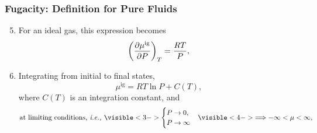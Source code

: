 \documentclass[10pt,compress,handout,ignorenonframetext,unknownkeysallowed]{beamer}
\begin{document}
\begin{frame}
  \frametitle{Fugacity: Definition for Pure Fluids}
        \begin{enumerate}\setcounter{enumi}{4}  
           \item<1-> For an ideal gas, this expression becomes
              \begin{displaymath}
                 \Partial[\mu^{\text{ig}}]{P}{T} = \frc{RT}{P}, 
              \end{displaymath}
              
           \item<2-> Integrating from initial to final states,
              \begin{displaymath}
                \mu^{\text{ig}} = RT\ln{P} + C(T), 
              \end{displaymath}
              where $C(T)$ is an integration constant, and
              \begin{displaymath}
                \text{at limiting conditions, \ie }
                \visible<3->{\begin{cases}
                  P\rightarrow 0, & \\
                  P\rightarrow \infty &
                \end{cases}}
                \visible<4->{\Longrightarrow -\infty < \mu < \infty,}
              \end{displaymath}               
        \end{enumerate}
\end{frame}
\normalsize
\end{document}
